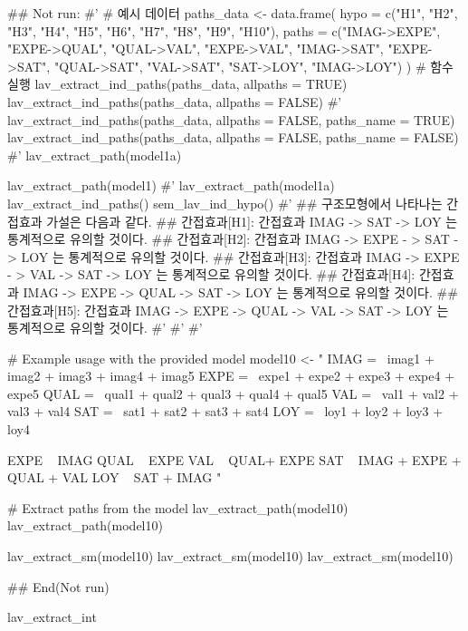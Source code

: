 \documentclass[a4paper]{book}
\begin{document}
\begin{Examples}
\begin{ExampleCode}

\#\# Not run: 
#'
# 예시 데이터
paths_data <- data.frame(
  hypo = c("H1", "H2", "H3", "H4", "H5",
  "H6", "H7", "H8", "H9", "H10"),
  paths = c("IMAG->EXPE", "EXPE->QUAL",
  "QUAL->VAL", "EXPE->VAL", "IMAG->SAT",
   "EXPE->SAT", "QUAL->SAT", "VAL->SAT", "SAT->LOY", "IMAG->LOY")
)
# 함수 실행
lav_extract_ind_paths(paths_data, allpaths = TRUE)
lav_extract_ind_paths(paths_data, allpaths = FALSE)
#'
lav_extract_ind_paths(paths_data, allpaths = FALSE, paths_name = TRUE)
lav_extract_ind_paths(paths_data, allpaths = FALSE, paths_name = FALSE)
#'
lav_extract_path(model1a)%

lav_extract_path(model1)%
#'
lav_extract_path(model1a) %
  lav_extract_ind_paths() %
  sem_lav_ind_hypo()
#'
## 구조모형에서 나타나는 간접효과 가설은 다음과 같다.
## 간접효과[H1]: 간접효과 IMAG -> SAT ->
LOY 는 통계적으로 유의할 것이다.
## 간접효과[H2]: 간접효과 IMAG -> EXPE -
> SAT -> LOY 는 통계적으로 유의할 것이다.
## 간접효과[H3]: 간접효과 IMAG -> EXPE -
> VAL -> SAT -> LOY 는 통계적으로 유의할 것이다.
## 간접효과[H4]: 간접효과 IMAG -> EXPE
-> QUAL -> SAT -> LOY 는 통계적으로 유의할 것이다.
## 간접효과[H5]: 간접효과 IMAG -> EXPE
-> QUAL -> VAL -> SAT -> LOY 는 통계적으로 유의할 것이다.
#' #'
#'

# Example usage with the provided model
model10 <- "
IMAG =~ imag1 + imag2 + imag3 + imag4 + imag5
EXPE =~ expe1 + expe2 + expe3 + expe4 + expe5
QUAL =~ qual1 + qual2 + qual3 + qual4 + qual5
VAL =~ val1 + val2 + val3 + val4
SAT =~ sat1 + sat2 + sat3 + sat4
LOY =~ loy1 + loy2 + loy3 + loy4

EXPE ~ IMAG
QUAL ~ EXPE
VAL ~  QUAL+ EXPE
SAT ~ IMAG + EXPE + QUAL + VAL
LOY ~ SAT + IMAG
"


# Extract paths from the model
lav_extract_path(model10)
lav_extract_path(model10)%

lav_extract_sm(model10)%
lav_extract_sm(model10)%
lav_extract_sm(model10)%


## End(Not run)

\end{ExampleCode}
\end{Examples}
%
\begin{Description}
lav\_extract\_int
\end{Description}
\end{document}

